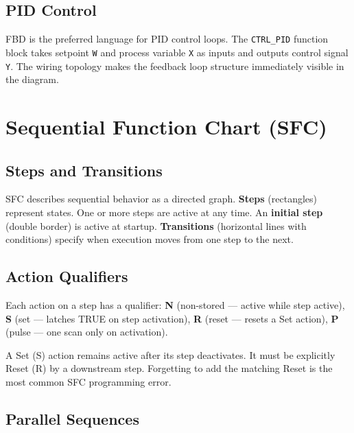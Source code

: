 \documentclass[12pt,twoside,openright]{memoir}
\begin{document}
\section{PID Control}

FBD is the preferred language for PID control loops. The \texttt{CTRL\_PID} function block takes setpoint \texttt{W} and process variable \texttt{X} as inputs and outputs control signal \texttt{Y}. The wiring topology makes the feedback loop structure immediately visible in the diagram.

\chapter{Sequential Function Chart (SFC)}

\section{Steps and Transitions}

SFC describes sequential behavior as a directed graph. \textbf{Steps} (rectangles) represent states. One or more steps are active at any time. An \textbf{initial step} (double border) is active at startup. \textbf{Transitions} (horizontal lines with conditions) specify when execution moves from one step to the next.

\section{Action Qualifiers}

Each action on a step has a qualifier: \textbf{N} (non-stored --- active while step active), \textbf{S} (set --- latches TRUE on step activation), \textbf{R} (reset --- resets a Set action), \textbf{P} (pulse --- one scan only on activation).

\begin{warningbox}
A Set (S) action remains active after its step deactivates. It must be explicitly Reset (R) by a downstream step. Forgetting to add the matching Reset is the most common SFC programming error.
\end{warningbox}

\section{Parallel Sequences}
\end{document}
